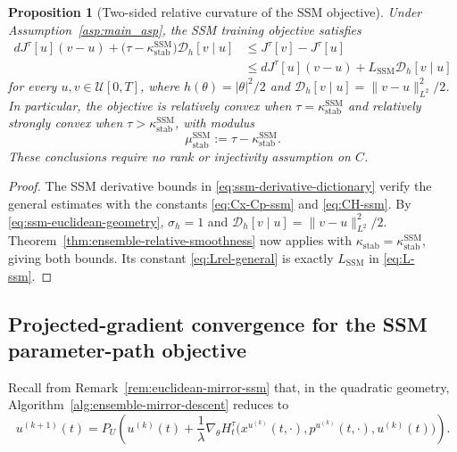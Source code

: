 \documentclass[11pt]{amsart}
\numberwithin{equation}{section} %
\newtheorem{proposition}{Proposition}[section]
\theoremstyle{remark}
\begin{document}
\begin{proposition}[Two-sided relative curvature of the SSM objective]
\label{prop:ssm-relative-smoothness}
Under Assumption~\ref{asp:main_asp}, the SSM training objective
satisfies
\begin{equation}
\label{eq:ssm-relative-smoothness}
\begin{aligned}
dJ^\tau[u](v-u)
+\bigl(\tau-\kappa_{\mathrm{stab}}^{\mathrm{SSM}}\bigr)
\mathcal D_h[v\mid u]
&\le J^\tau[v]-J^\tau[u]\\
&\le dJ^\tau[u](v-u)
+L_{\mathrm{SSM}}\mathcal D_h[v\mid u]
\end{aligned}
\end{equation}
for every $u,v\in\mathcal U[0,T]$, where
$h(\theta)=|\theta|^2/2$ and
$\mathcal D_h[v\mid u]=\|v-u\|_{L^2}^2/2$.
In particular, the objective is relatively convex when
$\tau=\kappa_{\mathrm{stab}}^{\mathrm{SSM}}$ and relatively
strongly convex when $\tau>\kappa_{\mathrm{stab}}^{\mathrm{SSM}}$,
with modulus
\begin{equation}
\label{eq:mu-stab-ssm}
\mu_{\mathrm{stab}}^{\mathrm{SSM}}
:=\tau-\kappa_{\mathrm{stab}}^{\mathrm{SSM}}.
\end{equation}
These conclusions require no rank or injectivity assumption on $C$.
\end{proposition}

\begin{proof}
The SSM derivative bounds in \eqref{eq:ssm-derivative-dictionary} verify
the general estimates with the constants
\eqref{eq:Cx-Cp-ssm} and \eqref{eq:CH-ssm}.  By
\eqref{eq:ssm-euclidean-geometry}, $\sigma_h=1$ and
$\mathcal D_h[v\mid u]=\|v-u\|_{L^2}^2/2$.
Theorem~\ref{thm:ensemble-relative-smoothness} now applies with
$\kappa_{\mathrm{stab}}=\kappa_{\mathrm{stab}}^{\mathrm{SSM}}$,
giving both bounds.  Its constant \eqref{eq:Lrel-general} is
exactly $L_{\mathrm{SSM}}$ in \eqref{eq:L-ssm}.
\end{proof}

\subsection{Projected-gradient convergence for the SSM parameter-path objective}
\label{subsec:ssm-gradient-convergence}

Recall from Remark~\ref{rem:euclidean-mirror-ssm} that, in the
quadratic geometry, Algorithm~\ref{alg:ensemble-mirror-descent}
reduces to
\begin{equation}
\label{eq:ssm-gradient-final}
u^{(k+1)}(t)
=P_U\!\left(
u^{(k)}(t)+\frac1\lambda
\nabla_\theta H_t^\tau\bigl(
x^{u^{(k)}}(t,\cdot),p^{u^{(k)}}(t,\cdot),u^{(k)}(t)
\bigr)\right).
\end{equation}
\end{document}
